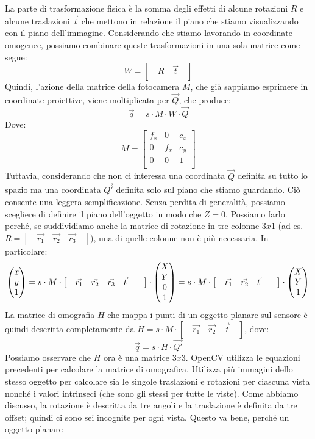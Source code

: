\documentclass[twoside]{supsistudent}
\begin{document}
La parte di trasformazione fisica è la somma degli effetti di alcune rotazioni $R$ e alcune traslazioni $\vec{t}$ che mettono in relazione il piano che stiamo 
visualizzando con il piano dell'immagine. Considerando che stiamo lavorando in coordinate omogenee, possiamo combinare queste trasformazioni in una 
sola matrice come segue:
\[W = [\quad R \quad \vec{t} \quad ]\]
Quindi, l'azione della matrice della fotocamera $M$, che già sappiamo esprimere in coordinate proiettive, viene moltiplicata per $\vec{Q}$, che produce:
\[\vec{q} = s \cdot M \cdot W \cdot \vec{Q}\]
Dove:
\[  
  M = \begin{bmatrix}
    f_{x} & 0 & c_{x}  \\
    0 & f_{x} & c_{y}  \\
    0 & 0 & 1  \\
  \end{bmatrix}
\]
Tuttavia, considerando che non ci interessa una coordinata $\vec{Q}$ definita su tutto lo spazio ma una coordinata $\vec{Q'}$ definita solo sul piano che stiamo guardando. 
Ciò consente una leggera semplificazione. Senza perdita di generalità, possiamo scegliere di definire il piano dell'oggetto in modo che $Z = 0$. Possiamo farlo 
perché, se suddividiamo anche la matrice di rotazione in tre colonne $3 x 1$ (ad es. $R = [\quad \vec{r_{1}} \quad \vec{r_{2}} \quad \vec{r_{3}} \quad ]$), una di quelle colonne non è più necessaria. In particolare:
\[
  \Spvek[c]{x;y;1} = 
  s \cdot M \cdot \begin{bmatrix} \quad \vec{r_{1}} \quad \vec{r_{2}} \quad \vec{r_{3}} \quad \vec{t} \quad \quad \end{bmatrix} \cdot \Spvek[c]{X;Y;0;1} = 
  s \cdot M \cdot \begin{bmatrix} \quad \vec{r_{1}} \quad \vec{r_{2}} \quad \vec{t} \quad \quad \end{bmatrix} \cdot \Spvek[c]{X;Y;1}
\]
La matrice di omografia $H$ che mappa i punti di un oggetto planare sul sensore è quindi descritta completamente da $H = s \cdot M \cdot [\quad \vec{r_{1}} \quad \vec{r_{2}} \quad \vec{t} \quad ]$, dove:
\[\vec{q} = s \cdot H \cdot \vec{Q'}\]
Possiamo osservare che $H$ ora è una matrice $3 x 3$. OpenCV utilizza le equazioni precedenti per calcolare la matrice di omografica. Utilizza più immagini dello stesso oggetto per calcolare sia le singole 
traslazioni e rotazioni per ciascuna vista nonché i valori intrinseci (che sono gli stessi per tutte le viste). Come abbiamo discusso, la rotazione è 
descritta da tre angoli e la traslazione è definita da tre offset; quindi ci sono sei incognite per ogni vista. Questo va bene, perché un oggetto planare 
\end{document}
